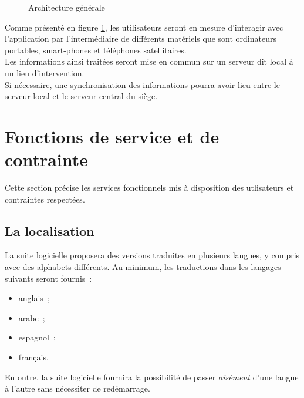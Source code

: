 \begin{figure}[htbp]
	\caption{Architecture générale}
	\label{ArchitectureGenerale}
\end{figure}

Comme présenté en figure \ref{ArchitectureGenerale}, les utilisateurs seront en mesure d'interagir avec l'application par l'intermédiaire de différents matériels que sont ordinateurs portables, smart-phones et téléphones satellitaires.
\\
Les informations ainsi traitées seront mise en commun sur un serveur dit \og local \fg{} à un lieu d'intervention.
\\
Si nécessaire, une synchronisation des informations pourra avoir lieu entre le serveur \og local \fg{} et le serveur \og central \fg{} du siège.

\section{Fonctions de service et de contrainte}
Cette section précise les services fonctionnels mis à disposition des utlisateurs et contraintes respectées.

\subsection{La localisation}
La suite logicielle proposera des versions traduites en plusieurs langues, y compris avec des alphabets différents. Au minimum, les traductions dans les langages suivants seront fournis~:
\begin{itemize}
	\item anglais~;
	\item arabe~;
	\item espagnol~;
	\item français.
\end{itemize}
En outre, la suite logicielle fournira la possibilité de passer \emph{aisément} d'une langue à l'autre sans nécessiter de redémarrage.

